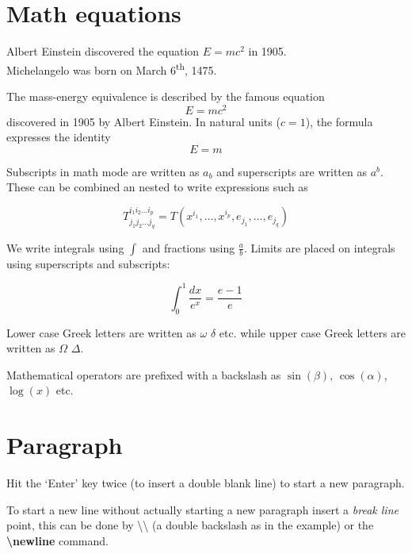 \documentclass[12pt, letterpaper, twoside]{article}
\begin{document}
\section{Math equations}
Albert Einstein discovered the equation $E=mc^2$ in 1905.\\
Michelangelo was born on March 6\textsuperscript{th}, 1475.


The mass-energy equivalence is described by the famous equation
\[ E=mc^2 \]
discovered in 1905 by Albert Einstein. 
In natural units ($c = 1$), the formula expresses the identity
\begin{equation}
E=m
\end{equation}

Subscripts in math mode are written as $a_b$ and superscripts are written as $a^b$. These can be combined an nested to write expressions such as

\[ T^{i_1 i_2 \dots i_p}_{j_1 j_2 \dots j_q} = T(x^{i_1},\dots,x^{i_p},e_{j_1},\dots,e_{j_q}) \]
 
We write integrals using $\int$ and fractions using $\frac{a}{b}$. Limits are placed on integrals using superscripts and subscripts:

\[ \int_0^1 \frac{dx}{e^x} =  \frac{e-1}{e} \]

Lower case Greek letters are written as $\omega$ $\delta$ etc. while upper case Greek letters are written as $\Omega$ $\Delta$.

Mathematical operators are prefixed with a backslash as $\sin(\beta)$, $\cos(\alpha)$, $\log(x)$ etc.

\section{Paragraph}
Hit the `Enter' key twice (to insert a double blank line) to start a new paragraph.


To start a new line without actually starting a new paragraph insert a \textit{break line} point, this can be done by \textbackslash{}\textbackslash{} (a double backslash as in the example) or the \textbf{\textbackslash{}newline} command. 
\end{document}
